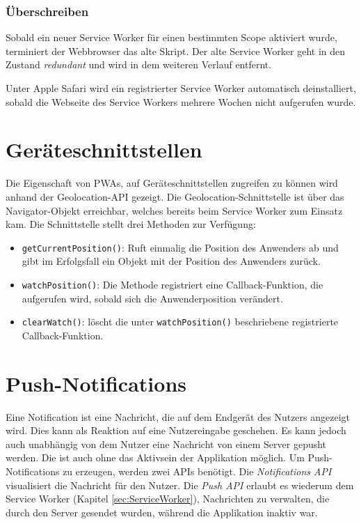 \subsubsection{Überschreiben}

Sobald ein neuer Service Worker für einen bestimmten Scope aktiviert wurde, terminiert der Webbrowser das alte Skript. Der alte Service Worker geht in den Zustand \textit{redundant} und wird in dem weiteren Verlauf entfernt. 

Unter Apple Safari wird ein registrierter Service Worker automatisch deinstalliert, sobald die Webseite des Service Workers mehrere Wochen nicht aufgerufen wurde. 



\section{Geräteschnittstellen}\label{sec:Geraeteschnittstelle}

Die Eigenschaft von PWAs, auf Geräteschnittstellen zugreifen zu können wird anhand der Geolocation-API gezeigt. 
Die Geolocation-Schnittstelle ist über das Navigator-Objekt erreichbar, welches bereits beim Service Worker zum Einsatz kam. Die Schnittstelle stellt drei Methoden zur Verfügung: 
\begin{itemize}
    \item \texttt{getCurrentPosition()}: Ruft einmalig die Position des Anwenders ab und gibt im Erfolgsfall ein Objekt mit der Position des Anwenders zurück. 
    \item \texttt{watchPosition()}: Die Methode registriert eine Callback-Funktion, die aufgerufen wird, sobald sich die Anwenderposition verändert. 
    \item \texttt{clearWatch()}: löscht die unter \texttt{watchPosition()} beschriebene registrierte Callback-Funktion. 
\end{itemize}

\section{Push-Notifications}\label{sec:ThPushNotifikations}

Eine Notification ist eine Nachricht, die auf dem Endgerät des Nutzers angezeigt wird. Dies kann als Reaktion auf eine Nutzereingabe geschehen. Es kann jedoch auch unabhängig von dem Nutzer eine Nachricht von einem Server \glqq gepusht\grqq{} werden. Die ist auch ohne das Aktivsein der Applikation möglich.  Um Push-Notifications zu erzeugen, werden zwei APIs benötigt. Die \textit{Notifications API} visualisiert die Nachricht für den Nutzer. Die \textit{Push API} erlaubt es wiederum dem Service Worker (Kapitel \ref{sec:ServiceWorker}), Nachrichten zu verwalten, die durch den Server gesendet wurden, während die Applikation inaktiv war. 

